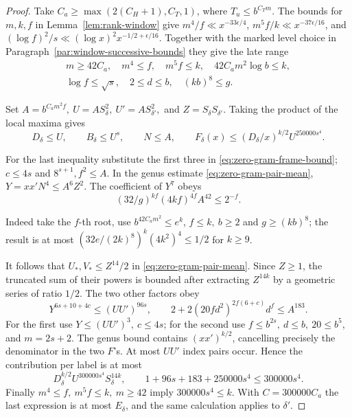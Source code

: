 \begin{proof}
Take \(C_a\ge\max(2(C_H+1),C_T,1)\), where
\(T_u\le b^{C_Tm}\). The bounds for \(m,k,f\) in Lemma~\ref{lem:rank-window}
give \(m^4/f\ll x^{-33\epsilon/4}\),
\(m^5 f/k\ll x^{-37\epsilon/16}\), and
\((\log f)^2/s\ll(\log x)^2x^{-1/2+\epsilon/16}\).
Together with the marked level choice in
Paragraph~\ref{par:window-successive-bounds} they give the late range
\[
 \begin{gathered}
 m\ge42C_a,\quad m^4\le f,\quad m^5 f\le k,\quad
 42 C_a m^2\log b\le k,\\
 \log f\le\sqrt{s},\quad 2\le d\le b,\quad (kb)^8\le g .
 \end{gathered}
\]

Set \(A=b^{C_am^2f},\ U=A S_\delta^2,\ U'=A S_{\delta'}^2,\)
and \(Z=S_\delta S_{\delta'}\).
Taking the product of the local maxima gives
\[
 D_\delta\le U,\qquad B_\delta\le U^s,\qquad N\le A,\qquad
 F_\delta(x)\le (D_\delta/x)^{k/2}U^{250000s^4}.
\]

For the last inequality substitute the first three in
\eqref{eq:zero-gram-frame-bound}; \(c\le4s\) and
\(8^{s+1},f^2\le A\). In the genus estimate
\eqref{eq:zero-gram-pair-mean}, \(Y=xx'N^4\le A^6Z^2\).
The coefficient of \(Y^7\) obeys
\[
          (32/g)^{kf}(4kf)^{4f} A^{42}\le 2^{-f}.
\]

Indeed take the \(f\)-th root, use \(b^{42C_am^2}\le e^k\),
\(f\le k,\ b\ge2\) and \(g\ge(kb)^8\); the result is at most
\((32e/(2k)^8)^k(4k^2)^4\le1/2\) for \(k\ge9\).

It follows that \(U_*,V_*\le Z^{14}/2\) in
\eqref{eq:zero-gram-pair-mean}. Since \(Z\ge1\), the truncated
sum of their powers is bounded after extracting \(Z^{14k}\)
by a geometric series of ratio \(1/2\). The two other factors obey
\[
 Y^{6s+10+4c}\le(UU')^{96s},\qquad
 2+2(20fd^2)^{2f(6+c)}d^f\le A^{183}.
\]
For the first use \(Y\le(UU')^3,\ c\le4s\); for the second
use \(f\le b^{2s},\ d\le b,\ 20\le b^5\), and \(m=2s+2\).
The genus bound contains \((xx')^{k/2}\), cancelling precisely
the denominator in the two \(F\)'s. At most \(UU'\) index
pairs occur. Hence the contribution per label is at most
\[
 D_\delta^{k/2}U^{300000s^4}S_\delta^{14k},
 \qquad 1+96s+183+250000s^4\le300000s^4 .
\]
Finally \(m^4\le f,\ m^5 f\le k,\ m\ge42\) imply
\(300000s^4\le k\). With \(C=300000C_a\) the last expression
is at most \(E_\delta\), and the same calculation applies
to \(\delta'\).
\end{proof}
